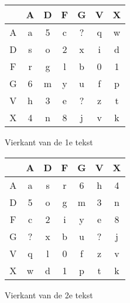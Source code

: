 \documentclass[a4paper,11pt]{article}
\begin{document}
\begin{figure}[h!]
   \begin{minipage}{0.45\textwidth}
		\begin{tabular}{c || c | c | c | c | c | c |}
		&A&D&F&G&V&X\\	\hline\hline
		A&a&5&c&?&q&w\\ \hline
		D&s&o&2&x&i&d\\ \hline
		F&r&g&l&b&0&1\\ \hline
		G&6&m&y&u&f&p\\ \hline
		V&h&3&e&?&z&t\\ \hline
		X&4&n&8&j&v&k\\ \hline
		\end{tabular}
		\caption{Vierkant van de 1e tekst }
    \end{minipage}
      \hspace{0.5cm}
   \begin{minipage}{0.45\textwidth}
		\begin{tabular}{c || c | c | c | c | c | c |}
		&A&D&F&G&V&X\\	\hline\hline
		A&a&s&r&6&h&4\\ \hline
		D&5&o&g&m&3&n\\ \hline
		F&c&2&i&y&e&8\\ \hline
		G&?&x&b&u&?&j\\ \hline
		V&q&l&0&f&z&v\\ \hline
		X&w&d&1&p&t&k\\ \hline
		\end{tabular}
		\caption{Vierkant van de 2e tekst }
    \end{minipage}
\end{figure}
\end{document}
